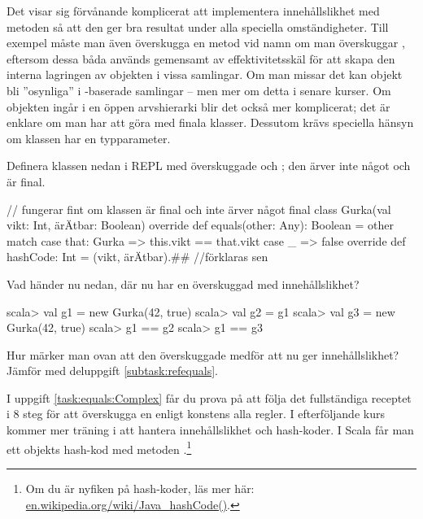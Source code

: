 \begin{Background}
Det visar sig förvånande komplicerat att implementera innehållslikhet med metoden  så att den ger bra resultat under alla speciella omständigheter. Till exempel måste man även överskugga en metod vid namn  om man överskuggar , eftersom dessa båda används gemensamt av effektivitetsskäl för att skapa den interna lagringen av objekten i vissa samlingar. Om man missar det kan objekt bli ''osynliga'' i -baserade samlingar -- men mer om detta i senare kurser. Om objekten ingår i en öppen arvshierarki blir det också mer komplicerat; det är enklare om man har att göra med finala klasser. Dessutom krävs speciella hänsyn om klassen har en typparameter.
\end{Background}

\noindent Definera klassen nedan i REPL med överskuggade  och ; den ärver inte något och är final.

\begin{Code}
// fungerar fint om klassen är final och inte ärver något
final class Gurka(val vikt: Int, ärÄtbar: Boolean) {
  override def equals(other: Any): Boolean = other match {
    case that: Gurka => this.vikt == that.vikt
    case _ => false
  }
  override def hashCode: Int = (vikt, ärÄtbar).## //förklaras sen
}
\end{Code}
\Subtask Vad händer nu nedan, där  nu har en överskuggad  med innehållslikhet?
\begin{REPL}
scala> val g1 = new Gurka(42, true)
scala> val g2 = g1
scala> val g3 = new Gurka(42, true)
scala> g1 == g2
scala> g1 == g3
\end{REPL}
\Subtask Hur märker man ovan att den överskuggade  medför att \code{==} nu ger innehållslikhet? Jämför med deluppgift \ref{subtask:refequals}.

I uppgift \ref{task:equals:Complex} får du prova på att följa det fullständiga receptet i 8 steg för att överskugga en  enligt konstens alla regler. I efterföljande kurs kommer mer träning i att hantera innehållslikhet och hash-koder. I Scala får man ett objekts hash-kod med metoden \code{##}.\footnote{Om du är nyfiken på hash-koder, läs mer här:
\href{https://en.wikipedia.org/wiki/Java_hashCode()}{en.wikipedia.org/wiki/Java\_hashCode()}.}



\SOLUTION


\TaskSolved \what


